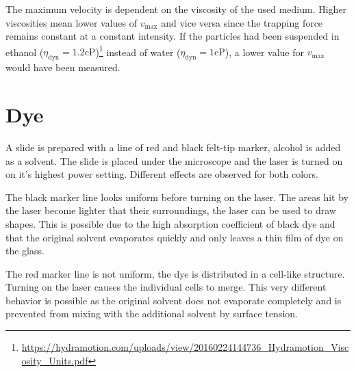 The maximum velocity is dependent on the viscosity of the used medium.
Higher viscosities mean lower values of $v_\text{max}$ and vice versa since the trapping force remains constant at a constant intensity.
If the particles had been suspended in ethanol ($\eta_\text{dyn} = \num{1.2}\text{cP}$)\footnote{\label{ref:viscosity}\url{https://hydramotion.com/uploads/view/20160224144736_Hydramotion_Viscosity_Units.pdf}} instead of water ($\eta_\text{dyn} = \num{1}\text{cP}$), a lower value for $v_\text{max}$ would have been measured.
\section{Dye}
A slide is prepared with a line of red and black felt-tip marker, alcohol is added as a solvent.
The slide is placed under the microscope and the laser is turned on on it's highest power setting.
Different effects are observed for both colors.

The black marker line looks uniform before turning on the laser.
The areas hit by the laser become lighter that their surroundings, the laser can be used to draw shapes.
This is possible due to the high absorption coefficient of black dye and that the original solvent evaporates quickly and only leaves a thin film of dye on the glass.

The red marker line is not uniform, the dye is distributed in a cell-like structure.
Turning on the laser causes the individual cells to merge.
This very different behavior is possible as the original solvent does not evaporate completely and is prevented from mixing with the additional solvent by surface tension.

